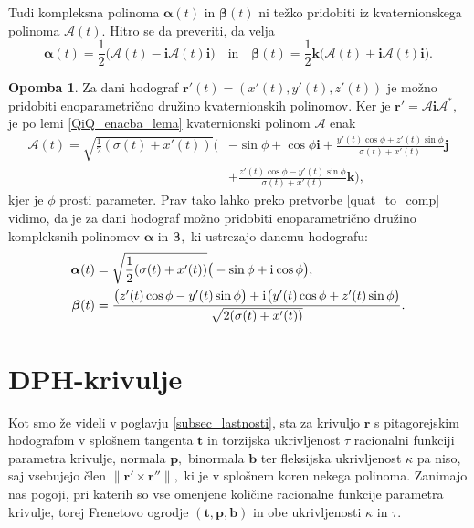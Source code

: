 \documentclass[12pt,a4paper,twoside]{article}
\newcommand{\iu}{\mathrm{i}\mkern1mu} %
\theoremstyle{definition} %
\newtheorem{opomba}[definicija]{Opomba}
\theoremstyle{plain} %
\theoremstyle{primerstyle}
\numberwithin{equation}{section}  %
\newcommand{\tV}{\mathbf{t}}
\newcommand{\bV}{\mathbf{b}}
\newcommand{\pV}{\mathbf{p}}
\newcommand{\rV}{\mathbf{r}}
\newcommand{\iV}{\mathbf{i}}
\newcommand{\jV}{\mathbf{j}}
\newcommand{\kV}{\mathbf{k}}
\newcommand{\AQ}{\mathcal{A}}
\newcommand{\balpha}{\boldsymbol \alpha}
\newcommand{\bbeta}{\boldsymbol \beta}
\begin{document}
Tudi kompleksna polinoma $\balpha(t)$ in $\bbeta(t)$ ni težko pridobiti iz kvaternionskega polinoma $\AQ(t).$ Hitro se da preveriti, da velja
\begin{equation}
	\label{quat_to_comp}
		\balpha(t) = \frac{1}{2}\big(\AQ(t)-\iV\AQ(t)\iV\big) \quad \text{in} \quad \bbeta(t)= \frac{1}{2}\kV\big(\AQ(t)+\iV\AQ(t)\iV\big).
\end{equation}

\begin{opomba}
	Za dani hodograf $\rV'(t)=(x'(t),y'(t),z'(t))$ je možno pridobiti enoparametrično družino kvaternionskih polinomov. Ker je $\rV'=\AQ\iV\AQ^*,$ je po lemi \ref{QiQ_enacba_lema} kvaternionski polinom $\AQ$ enak
	\begin{align*}
		\AQ(t)=\sqrt{\frac{1}{2}(\sigma(t)+x'(t))}\Big(&-\sin\phi+\cos\phi\iV+\frac{y'(t)\cos\phi+z'(t)\sin\phi}{\sigma(t)+x'(t)}\jV\\
		&+\frac{z'(t)\cos\phi-y'(t)\sin\phi}{\sigma(t)+x'(t)}\kV\Big),
	\end{align*}
	kjer je $\phi$ prosti parameter. Prav tako lahko preko pretvorbe \eqref{quat_to_comp} vidimo, da je za dani hodograf možno pridobiti enoparametrično družino kompleksnih polinomov $\balpha$ in $\bbeta,$ ki ustrezajo danemu hodografu:
	\begin{align*}
		\balpha(t)&=\sqrt{\frac{1}{2}(\sigma(t)+x'(t))}\big(-\sin\phi+\iu\cos\phi\big),\\
		\bbeta(t)&=\frac{\big(z'(t)\cos\phi-y'(t)\sin\phi\big)+\iu\big(y'(t)\cos\phi+z'(t)\sin\phi\big)}{\sqrt{2(\sigma(t)+x'(t))}}.
	\end{align*}
\end{opomba}
\clearpage
\section{DPH-krivulje}

Kot smo že videli v poglavju \ref{subsec_lastnosti}, sta za krivuljo $\rV$ s pitagorejskim hodografom v splošnem tangenta $\tV$ in torzijska ukrivljenost $\tau$ racionalni funkciji parametra krivulje, normala $\pV,$ binormala $\bV$ ter fleksijska ukrivljenost $\kappa$ pa niso, saj vsebujejo člen $\lVert \rV' \times \rV'' \rVert,$ ki je v splošnem koren nekega polinoma. Zanimajo nas pogoji, pri katerih so vse omenjene količine racionalne funkcije parametra krivulje, torej Frenetovo ogrodje $(\tV,\pV,\bV)$ in obe ukrivljenosti $\kappa$ in $\tau.$
\end{document}
